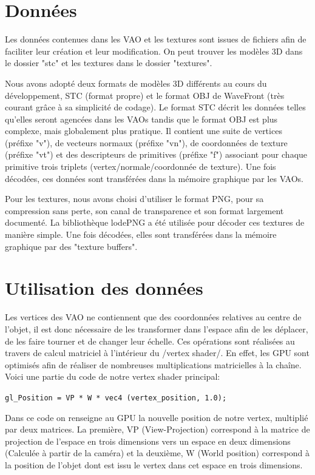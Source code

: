 \section{Données}
Les données contenues dans les VAO et les textures sont issues de fichiers afin de faciliter leur création et leur modification. On peut trouver les modèles 3D dans le dossier "stc" et les textures dans le dossier "textures".

Nous avons adopté deux formats de modèles 3D différents au cours du développement, STC (format propre) et le format OBJ de WaveFront (très courant grâce à sa simplicité de codage). Le format STC décrit les données telles qu'elles seront agencées dans les VAOs tandis que le format OBJ est plus complexe, mais globalement plus pratique. Il contient une suite de vertices (préfixe "v"), de vecteurs normaux (préfixe "vn"), de coordonnées de texture (préfixe "vt") et des descripteurs de primitives (préfixe "f") associant pour chaque primitive trois triplets (vertex/normale/coordonnée de texture). Une fois décodées, ces données sont transférées dans la mémoire graphique par les VAOs.

Pour les textures, nous avons choisi d'utiliser le format PNG, pour sa compression sans perte, son canal de transparence et son format largement documenté. La bibliothèque lodePNG a été utilisée pour décoder ces textures de manière simple. Une fois décodées, elles sont transférées dans la mémoire graphique par des "texture buffers".

\section{Utilisation des données}
Les vertices des VAO ne contiennent que des coordonnées relatives au centre de l'objet, il est donc nécessaire de les transformer dans l'espace afin de les déplacer, de les faire tourner et de changer leur échelle. Ces opérations sont réalisées au travers de calcul matriciel à l'intérieur du /vertex shader/. En effet, les GPU sont optimisés afin de réaliser de nombreuses multiplications matricielles à la chaîne. Voici une partie du code de notre vertex shader principal:\newline

\verb|gl_Position = VP * W * vec4 (vertex_position, 1.0);|\newline

Dans ce code on renseigne au GPU la nouvelle position de notre vertex, multiplié par deux matrices. La première, VP (View-Projection) correspond à la matrice de projection de l'espace en trois dimensions vers un espace en deux dimensions (Calculée à partir de la caméra) et la deuxième, W (World position) correspond à  la position de l'objet dont est issu le vertex dans cet espace en trois dimensions.

